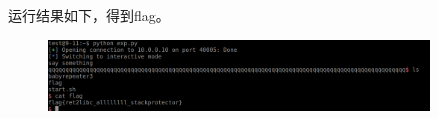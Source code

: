 \documentclass{article}
\begin{document}
    运行结果如下，得到flag。
    \begin{figure}[H]
    	\begin{center}
    		\includegraphics[width=0.9\textwidth]{9.png}
    	\end{center}
    \end{figure}
   
   
   
   
   
   
   
   
   
   
   
   
   
   
   
   
   
   
   
   
 
\end{document}
